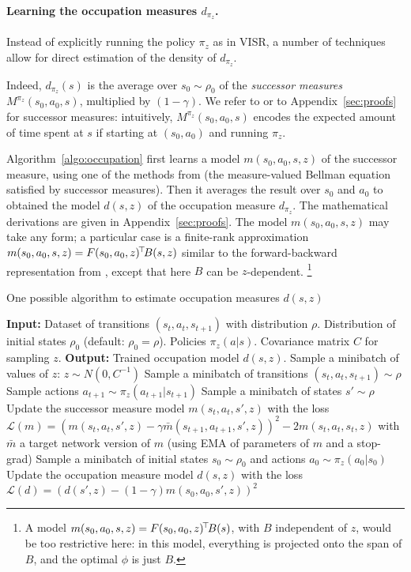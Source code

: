 \documentclass[11pt,a4paper]{article}
\newcommand{\loss}{\mathcal{L}}
\begin{document}
\paragraph{Learning the occupation measures $d_{\pi_z}$.}
Instead of explicitly running the policy $\pi_z$ as in VISR, a number of techniques allow for direct estimation of the
density of $d_{\pi_z}$.

Indeed, $d_{\pi_z}(s)$ is the average over $s_0\sim \rho_0$ of the
\emph{successor measures} $M^{\pi_z}(s_0,a_0,s)$, multiplied by
$(1-\gamma)$. We refer to \cite{successorstates} or to
Appendix~\ref{sec:proofs}
for successor measures: intuitively, $M^{\pi_z}(s_0,a_0,s)$ encodes the
expected amount of time spent at $s$ if starting at $(s_0,a_0)$ and
running $\pi_z$.

Algorithm~\ref{algo:occupation} first learns a model $m(s_0,a_0,s,z)$ of
the successor measure, using one of the methods from
\cite{successorstates} (the measure-valued Bellman equation satisfied by
successor measures). Then it averages the result over $s_0$ and $a_0$ to
obtained the model $d(s,z)$ of the occupation measure $d_{\pi_z}$. The
mathematical derivations are given in Appendix~\ref{sec:proofs}. The
model $m(s_0,a_0,s,z)$ may take any form; a particular case is a
finite-rank approximation $m(s_0,a_0,s,z)=F(s_0,a_0,z)^{\!\top}\!B(s,z)$
similar to the forward-backward representation from \cite{allpolicies},
except that here $B$ can be $z$-dependent.
\footnote{
A model $m(s_0,a_0,s,z)=F(s_0,a_0,z)^{\!\top}\!B(s)$, with $B$ independent
of $z$, would be too
restrictive here: in this model, everything is projected onto the span of
$B$, and the optimal $\phi$ is just $B$.
}

  \begin{algorithm}[tb]
    \small
    \caption{One possible algorithm to estimate occupation measures
    $d(s,z)$}
    \label{algo:occupation}
 \begin{algorithmic}
    \STATE \textbf{Input:} Dataset of transitions $(s_t,a_t,s_{t+1})$
    with distribution $\rho$.
    \STATE Distribution of initial states $\rho_0$
    (default: $\rho_0=\rho$).
    \STATE Policies $\pi_z(a|s)$.
    \STATE Covariance matrix $C$ for sampling $z$.
    \STATE \textbf{Output:} Trained occupation model $d(s,z)$.
    \STATE Sample a minibatch of values of $z$: $z\sim N(0,C^{-1})$
    \STATE Sample a minibatch of transitions $(s_t,a_t,s_{t+1})\sim \rho$
    \STATE Sample actions $a_{t+1}\sim \pi_z(a_{t+1}|s_{t+1})$
    \STATE Sample a minibatch of states $s'\sim \rho$
    \STATE Update the successor measure model $m(s_t,a_t,s',z)$ with the loss
    \algindent $\loss(m)=
\left(m(s_t,a_t,s',z)-\gamma
\bar m(s_{t+1},a_{t+1},s',z)\right)^2-2m(s_t,a_t,s_t,z)$ with $\bar m$ a
target network version of $m$ (using EMA of parameters of $m$ and a
stop-grad)
    \STATE Sample a minibatch of initial states $s_0\sim \rho_0$ and
    actions $a_0\sim \pi_z(a_0|s_0)$
    \STATE Update the occupation measure model $d(s,z)$ with the loss
    \algindent $\loss(d)=\left(d(s',z)-(1-\gamma)m(s_0,a_0,s',z)\right)^2$
    \ENDWHILE
 \end{algorithmic}
 \end{algorithm}
\end{document}
